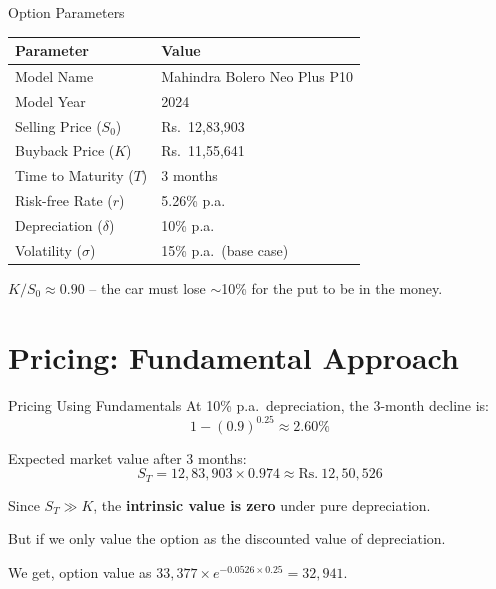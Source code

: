 \documentclass[11pt, aspectratio=43]{beamer}
\begin{document}
\begin{frame}{Option Parameters}
    \begin{table}
        \centering
        \begin{tabular}{@{}ll@{}}
            \toprule
            \textbf{Parameter} & \textbf{Value} \\
            \midrule
            Model Name & Mahindra Bolero Neo Plus P10 \\
            Model Year & 2024 \\
            Selling Price ($S_0$) & Rs.~12,83,903 \\
            Buyback Price ($K$) & Rs.~11,55,641 \\
            Time to Maturity ($T$) & 3 months \\
            Risk-free Rate ($r$) & 5.26\% p.a. \\
            Depreciation ($\delta$) & 10\% p.a. \\
            Volatility ($\sigma$) & 15\% p.a.\ (base case) \\
            \bottomrule
        \end{tabular}
    \end{table}

    \vspace{0.5em}
    $K / S_0 \approx 0.90$ -- the car must lose $\sim$10\% for the put to be in the money.
\end{frame}


\section{Pricing: Fundamental Approach}

\begin{frame}{Pricing Using Fundamentals}
    At 10\% p.a.\ depreciation, the 3-month decline is:
    \[
        1 - (0.9)^{0.25} \approx 2.60\%
    \]

    Expected market value after 3 months:
    \[
        S_T = 12{,}83{,}903 \times 0.974 \approx \text{Rs.}~12{,}50{,}526
    \]

    \vspace{0.3em}
    Since $S_T \gg K$, the \textbf{intrinsic value is zero} under pure depreciation.

    \vspace{0.5em}
    But if we only value the option as the discounted value of depreciation. 
    
    We get, option value as $33,377 \times e^{- 0.0526 \times 0.25} = 32,941$.


\end{frame}
\end{document}
